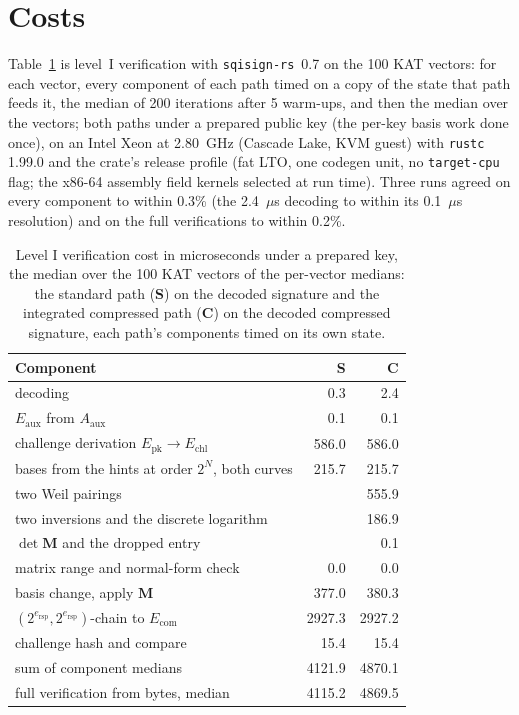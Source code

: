 \documentclass[version=preprint,notanonymous]{iacrcc}
\newcommand{\ers}{e_{\mathrm{rsp}}}
\newcommand{\Mm}{\mathbf{M}}
\newcommand{\Echl}{E_{\mathrm{chl}}}
\newcommand{\Eaux}{E_{\mathrm{aux}}}
\newcommand{\Ecom}{E_{\mathrm{com}}}
\newcommand{\Epk}{E_{\mathrm{pk}}}
\begin{document}
\section{Costs}
\label{sec:cost}

Table~\ref{tab:breakdown} is level~I verification with
\texttt{sqisign-rs}~0.7 on the 100 KAT vectors: for each vector, every
component of each path timed on a copy of the state that path feeds it,
the median of 200 iterations after 5 warm-ups, and then the median over
the vectors; both paths under a prepared public key (the per-key basis
work done once), on an Intel Xeon at 2.80~GHz (Cascade Lake, KVM guest)
with \texttt{rustc} 1.99.0 and the crate's release profile (fat LTO, one
codegen unit, no \texttt{target-cpu} flag; the x86-64 assembly field
kernels selected at run time). Three runs agreed on every component to
within 0.3\% (the 2.4~$\mu$s decoding to within its 0.1~$\mu$s
resolution) and on the full verifications to within 0.2\%.

\begin{table}[H]
\centering
\caption{Level I verification cost in microseconds under a prepared key,
the median over the 100 KAT vectors of the per-vector medians: the
standard path (\textbf{S}) on the decoded signature and the integrated
compressed path (\textbf{C}) on the decoded compressed signature, each
path's components timed on its own state.}
\label{tab:breakdown}
\small
\begin{tabular}{l r r}
\toprule
\textbf{Component} & \textbf{S} & \textbf{C} \\
\midrule
decoding & 0.3 & 2.4 \\
$\Eaux$ from $A_{\mathrm{aux}}$ & 0.1 & 0.1 \\
challenge derivation $\Epk \to \Echl$ & 586.0 & 586.0 \\
bases from the hints at order $2^N$, both curves & 215.7 & 215.7 \\
two Weil pairings &  & 555.9 \\
two inversions and the discrete logarithm &  & 186.9 \\
$\det \Mm$ and the dropped entry &  & 0.1 \\
matrix range and normal-form check & 0.0 & 0.0 \\
basis change, apply $\Mm$ & 377.0 & 380.3 \\
$(2^{\ers}, 2^{\ers})$-chain to $\Ecom$ & 2927.3 & 2927.2 \\
challenge hash and compare & 15.4 & 15.4 \\
\midrule
sum of component medians & 4121.9 & 4870.1 \\
full verification from bytes, median & 4115.2 & 4869.5 \\
\bottomrule
\end{tabular}
\end{table}
\end{document}
